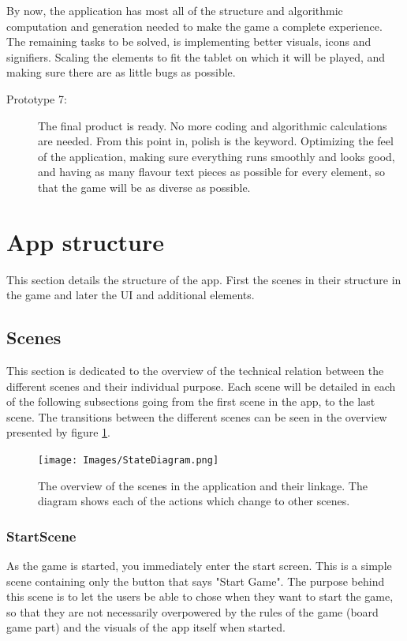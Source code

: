 By now, the application has most all of the structure and algorithmic computation and generation needed to make the game a complete experience.
The remaining tasks to be solved, is implementing better visuals, icons and signifiers. Scaling the elements to fit the tablet on which it will be played, and making sure there are as little bugs as possible.

\begin{description}
\item[Prototype 7:]
The final product is ready. No more coding and algorithmic calculations are needed. From this point in, polish is the keyword. Optimizing the feel of the application, making sure everything runs smoothly and looks good, and having as many flavour text pieces as possible for every element, so that the game will be as diverse as possible.
\end{description}

\section{App structure}
This section details the structure of the app. First the scenes in their structure in the game and later the UI and additional elements.

\subsection{Scenes}
This section is dedicated to the overview of the technical relation between the different scenes and their individual purpose. Each scene will be detailed in each of the following subsections going from the first scene in the app, to the last scene.
The transitions between the different scenes can be seen in the overview presented by figure \ref{fig:appState}.

\begin{figure}[h]
    \centering
    \texttt{[image: Images/StateDiagram.png]}
    \caption{The overview of the scenes in the application and their linkage. The diagram shows each of the actions which change to other scenes.}
    \label{fig:appState}
\end{figure}

\subsubsection{StartScene}
As the game is started, you immediately enter the start screen. This is a simple scene containing only the button that says "Start Game". The purpose behind this scene is to let the users be able to chose when they want to start the game, so that they are not necessarily overpowered by the rules of the game (board game part) and the visuals of the app itself when started.

